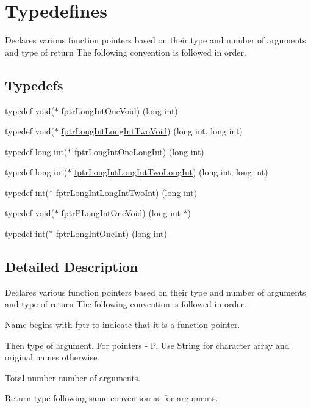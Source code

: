 \hypertarget{group__typedefines}{}\section{Typedefines}
\label{group__typedefines}


Declares various function pointers based on their type and number of arguments and type of return The following convention is followed in order.  


\subsection*{Typedefs}
\begin{DoxyCompactItemize}
\item 
typedef void($\ast$ \hyperlink{group__typedefines_ga3bd969ff6cd52b00d54500638dffb379}{fptr\+Long\+Int\+One\+Void}) (long int)
\item 
typedef void($\ast$ \hyperlink{group__typedefines_gac41973fac47233da48589a3cc3398b51}{fptr\+Long\+Int\+Long\+Int\+Two\+Void}) (long int, long int)
\item 
typedef long int($\ast$ \hyperlink{group__typedefines_ga2fcac75b66a8e69e0de28880cc60ba7f}{fptr\+Long\+Int\+One\+Long\+Int}) (long int)
\item 
typedef long int($\ast$ \hyperlink{group__typedefines_ga38e424990ad08db2dfae4135eebda12f}{fptr\+Long\+Int\+Long\+Int\+Two\+Long\+Int}) (long int, long int)
\item 
typedef int($\ast$ \hyperlink{group__typedefines_ga61711f6fdcc29325f1212e26845b466f}{fptr\+Long\+Int\+Long\+Int\+Two\+Int}) (long int)
\item 
typedef void($\ast$ \hyperlink{group__typedefines_ga15b0509ad469369c2107f96d532aa5d5}{fptr\+P\+Long\+Int\+One\+Void}) (long int $\ast$)
\item 
typedef int($\ast$ \hyperlink{group__typedefines_ga870022f202fc4309fe0b4f4b9bddbb51}{fptr\+Long\+Int\+One\+Int}) (long int)
\end{DoxyCompactItemize}


\subsection{Detailed Description}
Declares various function pointers based on their type and number of arguments and type of return The following convention is followed in order. 


\begin{DoxyEnumerate}
\item Name begins with \textquotesingle{}fptr\textquotesingle{} to indicate that it is a function pointer.
\item Then type of argument. For pointers -\/ \textquotesingle{}P\textquotesingle{}. Use String for character array and original names otherwise.
\item Total number number of arguments.
\item Return type following same convention as for arguments. 
\end{DoxyEnumerate}

